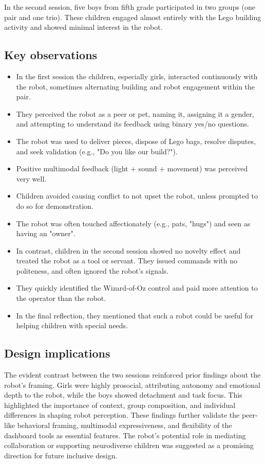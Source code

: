 \documentclass[a4paper]{usiinfbachelorproject}
\begin{document}
In the second session, five boys from fifth grade participated in two groups (one pair and one trio).
These children engaged almost entirely with the Lego building activity and showed minimal interest in the robot.

\subsection*{\textbf{Key observations}}
\begin{itemize}
    \item In the first session the children, especially girls, interacted continuously with the robot, sometimes alternating building and robot engagement within the pair.
    \item They perceived the robot as a peer or pet, naming it, assigning it a gender, and attempting to understand its feedback using binary yes/no questions.
    \item The robot was used to deliver pieces, dispose of Lego bags, resolve disputes, and seek validation (e.g., "Do you like our build?").
    \item Positive multimodal feedback (light + sound + movement) was perceived very well.
    \item Children avoided causing conflict to not upset the robot, unless prompted to do so for demonstration.
    \item The robot was often touched affectionately (e.g., pats, "hugs") and seen as having an "owner".
    \item In contrast, children in the second session showed no novelty effect and treated the robot as a tool or servant.
          They issued commands with no politeness, and often ignored the robot's signals.
    \item They quickly identified the Wizard-of-Oz control and paid more attention to the operator than the robot.
    \item In the final reflection, they mentioned that such a robot could be useful for helping children with special needs.
\end{itemize}

\subsection*{\textbf{Design implications}}
The evident contrast between the two sessions reinforced prior findings about the robot's framing.
Girls were highly prosocial, attributing autonomy and emotional depth to the robot, while the boys showed detachment and task focus.
This highlighted the importance of context, group composition, and individual differences in shaping robot perception.
These findings further validate the peer-like behavioral framing, multimodal expressiveness, and flexibility of the dashboard tools as essential features.
The robot's potential role in mediating collaboration or supporting neurodiverse children was suggested as a promising direction for future inclusive design.
\end{document}
